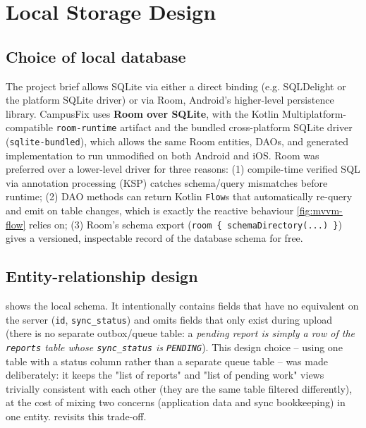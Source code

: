 \section{Local Storage Design}
\label{sec:local-storage-design}

\subsection{Choice of local database}

The project brief allows SQLite via either a direct binding (e.g. SQLDelight
or the platform SQLite driver) or via Room, Android's higher-level
persistence library. CampusFix uses \textbf{Room over SQLite}, with the
Kotlin Multiplatform-compatible \texttt{room-runtime} artifact and the
bundled cross-platform SQLite driver (\texttt{sqlite-bundled}), which
allows the same Room entities, DAOs, and generated implementation to run
unmodified on both Android and iOS. Room was preferred over a
lower-level driver for three reasons: (1) compile-time verified SQL via
annotation processing (KSP) catches schema/query mismatches before
runtime; (2) DAO methods can return Kotlin \texttt{Flow}s that
automatically re-query and emit on table changes, which is exactly the
reactive behaviour \cref{fig:mvvm-flow} relies on; (3) Room's schema
export (\texttt{room \{ schemaDirectory(...) \}}) gives a versioned,
inspectable record of the database schema for free.

\subsection{Entity-relationship design}

 shows the local schema. It intentionally contains
fields that have no equivalent on the server (\texttt{id},
\texttt{sync\_status}) and omits fields that only exist during upload
(there is no separate outbox/queue table: a \emph{pending report is simply
a row of the \texttt{reports} table whose \texttt{sync\_status} is
\texttt{PENDING}}). This design choice -- using one table with a status
column rather than a separate queue table -- was made deliberately: it
keeps the "list of reports" and "list of pending work" views trivially
consistent with each other (they are the same table filtered differently),
at the cost of mixing two concerns (application data and sync bookkeeping)
in one entity.  revisits this trade-off.

